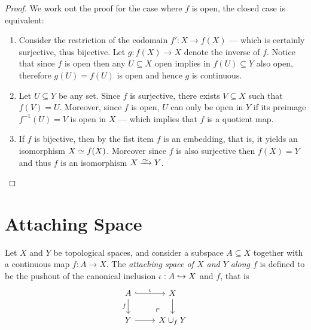 \begin{proof}
    We work out the proof for the case where \(f\) is open, the closed case is
    equivalent:
    \begin{enumerate}\setlength\itemsep{0em}
        \item Consider the restriction of the codomain \(f': X \to f(X)\) --- which is
              certainly surjective, thus bijective. Let \(g: f(X) \to X\) denote the inverse
              of \(f\). Notice that since \(f\) is open then any \(U \subseteq X\) open
              implies in \(f(U) \subseteq Y\) also open, therefore \(g(U) = f(U)\) is open
              and hence \(g\) is continuous.

        \item Let \(U \subseteq Y\) be any set. Since \(f\) is surjective, there exists
              \(V \subseteq X\) such that \(f(V) = U\). Moreover, since \(f\) is open, \(U\)
              can only be open in \(Y\) if its preimage \(f^{-1}(U) = V\) is open in \(X\)
              --- which implies that \(f\) is a quotient map.

        \item If \(f\) is bijective, then by the fist item \(f\) is an embedding, that
              is, it yields an isomorphism \(X \simeq f(X)\). Moreover since \(f\) is also
              surjective then \(f(X) = Y\) and thus \(f\) is an isomorphism \(X \isoto Y\).
    \end{enumerate}
\end{proof}

\section{Attaching Space}

\begin{definition}
    \label{def:attaching-space}
    Let \(X\) and \(Y\) be topological spaces, and consider a subspace
    \(A \subseteq X\) together with a continuous map \(f: A \to X\). The
    \emph{attaching space of \(X\) and \(Y\) along \(f\)} is defined to be the
    pushout of the canonical inclusion \(\iota: A \hookrightarrow X\) and \(f\), that is
    \[
        \begin{tikzcd}
            A \ar[r, hook, "\iota"] \ar[d, "f"']
            \ar[rd, phantom, very near end, "\ulcorner"]
            &X \ar[d] \\
            Y \ar[r] &X \cup_f Y
        \end{tikzcd}
    \]
\end{definition}

